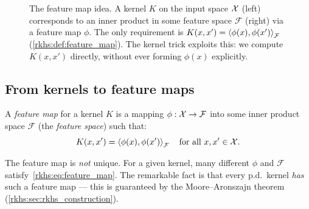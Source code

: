 \begin{notechapter}
\begin{figure}[ht]
\caption{The feature map idea. A kernel $K$ on the
input space $\mathcal{X}$ (left) corresponds to an inner product
in some feature space $\mathcal{F}$ (right) via a
feature map $\phi$. The only requirement is
$K(x,x') = \left\langle \phi(x), \phi(x') \right\rangle_{\mathcal{F}}$
(\cref{rkhs:def:feature_map}). The kernel trick
exploits this: we compute $K(x,x')$ directly, without
ever forming $\phi(x)$ explicitly.}
\label{rkhs:fig:feature_map_concept}
\end{figure}

\subsection{From kernels to feature maps}

\begin{definition}
\label{rkhs:def:feature_map}
A \emph{feature map} for a kernel $K$ is a mapping $\phi: \mathcal{X} \to
\mathcal{F}$ into some inner product space $\mathcal{F}$ (the
\emph{feature space}) such that:
\begin{equation}
\label{rkhs:eq:feature_map}
K(x, x') = \left\langle \phi(x), \phi(x') \right\rangle_{\mathcal{F}} \quad \text{for all } x, x' \in \mathcal{X}.
\end{equation}
\end{definition}

The feature map is \emph{not} unique. For a given kernel, many different
$\phi$ and $\mathcal{F}$ satisfy~\eqref{rkhs:eq:feature_map}. The remarkable
fact is that every p.d.\ kernel \emph{has} such a feature map --- this
is guaranteed by the Moore--Aronszajn theorem
(\cref{rkhs:sec:rkhs_construction}).


\end{notechapter}
